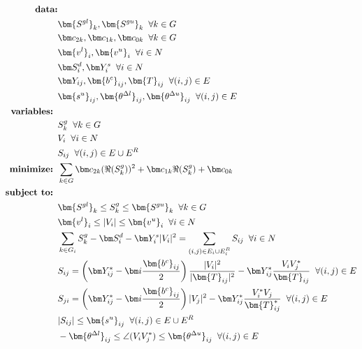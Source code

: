 \begin{align}
%
\mbox{\bf data:} & \nonumber \\ 
& \bm {S^{gl}}_k, \bm {S^{gu}}_k \;\; \forall k \in G \nonumber \\
& \bm c_{2k}, \bm c_{1k}, \bm c_{0k} \;\; \forall k \in G \nonumber \\
& \bm {v^l}_i, \bm {v^u}_i \;\; \forall i \in N \nonumber \\
& \bm S^d_i, \bm Y^s_{i} \;\; \forall i \in N \nonumber \\
& \bm Y_{ij}, \bm {b^c}_{ij}, \bm{T}_{ij} \;\; \forall (i,j) \in E \nonumber \\
& \bm {s^u}_{ij}, \bm {\theta^{\Delta l}}_{ij}, \bm {\theta^{\Delta u}}_{ij} \;\; \forall (i,j) \in E  \nonumber \\
%
\mbox{\bf variables: } & \nonumber \\
& S^g_k \;\; \forall k\in G \nonumber \\
& V_i \;\; \forall i\in N \nonumber \\
& S_{ij} \;\; \forall (i,j) \in E \cup E^R \nonumber \\
%
\mbox{\bf minimize: } & \sum_{k \in G} \bm c_{2k} (\Re(S^g_k))^2 + \bm c_{1k}\Re(S^g_k) + \bm c_{0k} \\
%
\mbox{\bf subject to: } & \nonumber \\
& \bm {S^{gl}}_k \leq S^g_k \leq \bm {S^{gu}}_k \;\; \forall k \in G  \\
& \bm {v^l}_i \leq |V_i| \leq \bm {v^u}_i \;\; \forall i \in N \\
& \sum_{\substack{k \in G_i}} S^g_k - {\bm S^d_i} - \bm Y^s_{i} |V_i|^2 = \sum_{\substack{(i,j)\in E_i \cup E_i^R}} S_{ij} \;\; \forall i\in N \\ 
& S_{ij} = \left( \bm Y^*_{ij} - \bm i\frac{\bm {b^c}_{ij}}{2} \right) \frac{|V_i|^2}{|\bm{T}_{ij}|^2} - \bm Y^*_{ij} \frac{V_i V^*_j}{\bm{T}_{ij}} \;\; \forall (i,j)\in E \\
& S_{ji} = \left( \bm Y^*_{ij} - \bm i\frac{\bm {b^c}_{ij}}{2} \right) |V_j|^2 - \bm Y^*_{ij} \frac{V^*_i V_j}{\bm{T}^*_{ij}} \;\; \forall (i,j)\in E \\
& |S_{ij}| \leq \bm {s^u}_{ij} \;\; \forall (i,j) \in E \cup E^R \\
& -\bm {\theta^{\Delta l}}_{ij} \leq \angle (V_i V^*_j) \leq \bm {\theta^{\Delta u}}_{ij} \;\; \forall (i,j) \in E
%
\end{align}
